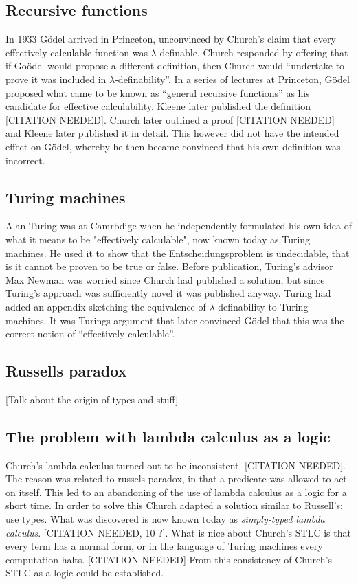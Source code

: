 \subsection{Recursive functions}

In 1933 G\"odel arrived in Princeton, unconvinced by Church's claim that every effectively calculable function was $\lambda$-definable. Church responded by offering that if Go\"odel would propose a different definition, then Church would ``undertake to prove it was included in $\lambda$-definability''. In a series of lectures at Princeton, G\"odel proposed what came to be known as ``general recursive functions'' as his candidate for effective calculability. Kleene later published the definition [CITATION NEEDED]\cite{}. Church later outlined a proof [CITATION NEEDED]\cite{} and Kleene later published it in detail. This however did not have the intended effect on G\"odel, whereby he then became convinced that his own definition was incorrect.

\subsection{Turing machines}

Alan Turing was at Camrbdige when he independently formulated his own idea of what it means to be "effectively calculable", now known today as Turing machines. He used it to show that the Entscheidungsproblem is undecidable, that is it cannot be proven to be true or false. Before publication, Turing's advisor Max Newman was worried since Church had published a solution, but since Turing's approach was sufficiently novel it was published anyway. Turing had added an appendix sketching the equivalence of $\lambda$-definability to Turing machines. It was Turings argument that later convinced G\"odel that this was the correct notion of ``effectively calculable''.

\subsection{Russells paradox}

[Talk about the origin of types and stuff]

\subsection{The problem with lambda calculus as a logic}

Church's lambda calculus turned out to be inconsistent. \cite{}[CITATION NEEDED]. The reason was related to russels paradox, in that a predicate was allowed to act on itself. This led to an abandoning of the use of lambda calculus as a logic for a short time. In order to solve this Church adapted a solution similar to Russell's: use types. What was discovered is now known today as \emph{simply-typed lambda calculus}. \cite{} [CITATION NEEDED, 10 ?]. What is nice about Church's STLC is that every term has a normal form, or in the language of Turing machines every computation halts. \cite{} [CITATION NEEDED] From this consistency of Church's STLC as a logic could be established.

